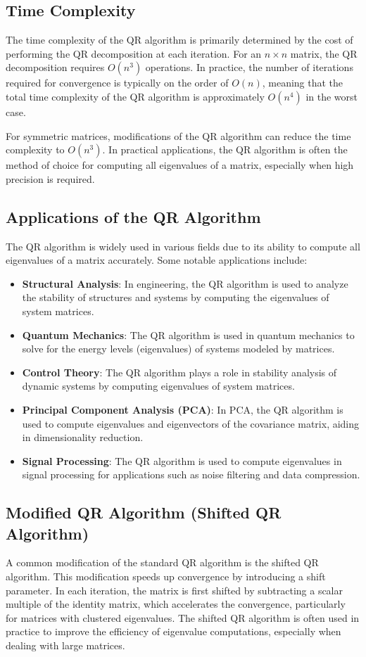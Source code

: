 \documentclass[journal]{IEEEtran}
\begin{document}
\subsection{Time Complexity}
The time complexity of the QR algorithm is primarily determined by the cost of performing the QR decomposition at each iteration. For an $n \times n$ matrix, the QR decomposition requires $O(n^3)$ operations. In practice, the number of iterations required for convergence is typically on the order of $O(n)$, meaning that the total time complexity of the QR algorithm is approximately $O(n^4)$ in the worst case.

For symmetric matrices, modifications of the QR algorithm can reduce the time complexity to $O(n^3)$. In practical applications, the QR algorithm is often the method of choice for computing all eigenvalues of a matrix, especially when high precision is required.

\subsection{Applications of the QR Algorithm}
The QR algorithm is widely used in various fields due to its ability to compute all eigenvalues of a matrix accurately. Some notable applications include:

\begin{itemize}
    \item \textbf{Structural Analysis}: In engineering, the QR algorithm is used to analyze the stability of structures and systems by computing the eigenvalues of system matrices.
    \item \textbf{Quantum Mechanics}: The QR algorithm is used in quantum mechanics to solve for the energy levels (eigenvalues) of systems modeled by matrices.
    \item \textbf{Control Theory}: The QR algorithm plays a role in stability analysis of dynamic systems by computing eigenvalues of system matrices.
    \item \textbf{Principal Component Analysis (PCA)}: In PCA, the QR algorithm is used to compute eigenvalues and eigenvectors of the covariance matrix, aiding in dimensionality reduction.
    \item \textbf{Signal Processing}: The QR algorithm is used to compute eigenvalues in signal processing for applications such as noise filtering and data compression.
\end{itemize}

\subsection{Modified QR Algorithm (Shifted QR Algorithm)}
A common modification of the standard QR algorithm is the shifted QR algorithm. This modification speeds up convergence by introducing a shift parameter. In each iteration, the matrix is first shifted by subtracting a scalar multiple of the identity matrix, which accelerates the convergence, particularly for matrices with clustered eigenvalues. The shifted QR algorithm is often used in practice to improve the efficiency of eigenvalue computations, especially when dealing with large matrices.
\end{document}
